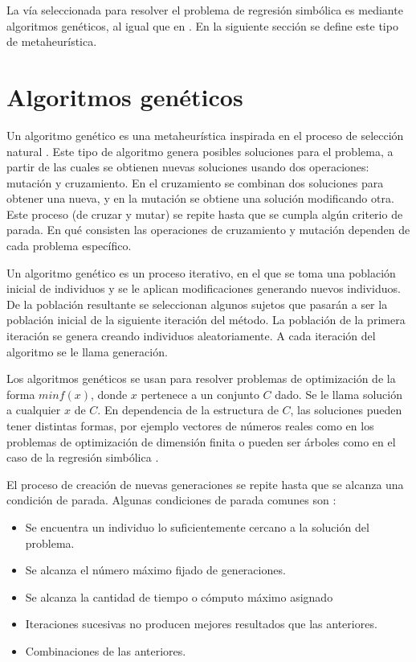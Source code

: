 La vía seleccionada para resolver el problema de regresión simbólica es mediante algoritmos genéticos, al igual que en \cite{gaucel2014learning, iba2008inference, koza1994genetic, kronberger2019identification}. En la siguiente sección se define este tipo de metaheurística.

\section{Algoritmos genéticos}\label{section:genetic_algorithm}

Un algoritmo genético es una metaheurística inspirada en el proceso de selección natural \cite{mitchell1998introduction}. Este tipo de algoritmo genera posibles soluciones para el problema, a partir de las cuales se obtienen nuevas soluciones usando dos operaciones: mutación y cruzamiento. En el cruzamiento se combinan dos soluciones para obtener una nueva, y en la mutación se obtiene una solución modificando otra. Este proceso (de cruzar y mutar) se repite hasta que se cumpla algún criterio de parada. En qué consisten las operaciones de cruzamiento y mutación dependen de cada problema específico.

Un algoritmo genético es un proceso iterativo, en el que se toma una población inicial de individuos y se le aplican modificaciones generando nuevos individuos. De la población resultante se seleccionan algunos sujetos que pasarán a ser la población inicial de la siguiente iteración del método. La población de la primera iteración se genera creando individuos aleatoriamente. A cada iteración del algoritmo se le llama generación.

Los algoritmos genéticos se usan para resolver problemas de optimización de la forma $min f(x)$, donde $x$ pertenece a un conjunto $C$ dado. Se le llama solución a cualquier $x$ de $C$. En dependencia de la estructura de $C$, las soluciones pueden tener distintas formas, por ejemplo vectores de números reales como en los problemas de optimización de dimensión finita \cite{mitchell1998introduction} o pueden ser árboles como en el caso de la regresión simbólica \cite{mitchell1998introduction}.

El proceso de creación de nuevas generaciones se repite hasta que se alcanza una condición de parada. Algunas condiciones de parada comunes son \cite{mitchell1998introduction}:

\begin{itemize}
    \item Se encuentra un individuo lo suficientemente cercano a la solución del problema.
    \item Se alcanza el número máximo fijado de generaciones.
    \item Se alcanza la cantidad de tiempo o cómputo máximo asignado
    \item Iteraciones sucesivas no producen mejores resultados que las anteriores.
    \item Combinaciones de las anteriores.
\end{itemize}

